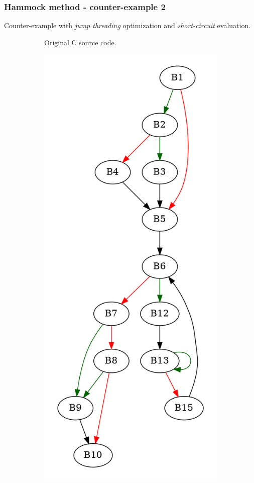 \documentclass[aspectratio=1610]{beamer}
\begin{document}
\begin{frame}
	\frametitle{Hammock method - counter-example 2}
	Counter-example with \textit{jump threading} optimization and \textit{short-circuit} evaluation.
	\begin{figure}[htbp]
		\centering
		\begin{subfigure}[b]{0.30\textwidth}
			\centering
			
			\caption{Original C source code.}
		\end{subfigure}
		\begin{subfigure}[b]{0.50\textwidth}
			\centering
			\includegraphics[height=0.7\paperheight]{inc/methods/hammock/counter-example/jump-threading-and-short-circuit/jump-threading-and-short-circuit_jump/f.png}

\end{subfigure}
\end{figure}
\end{frame}
\end{document}

